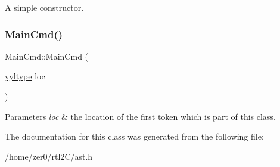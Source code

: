 A simple constructor. \mbox{\label{class_main_cmd_a36da38d394389df52d99475914d62171}} 
\subsubsection{\texorpdfstring{Main\+Cmd()}{MainCmd()}\hspace{0.1cm}{\footnotesize\ttfamily [2/2]}}
{\footnotesize\ttfamily Main\+Cmd\+::\+Main\+Cmd (\begin{DoxyParamCaption}\item[{\hyperlink{structyyltype}{yyltype}}]{loc }\end{DoxyParamCaption})\hspace{0.3cm}{\ttfamily [inline]}}


\begin{DoxyParams}{Parameters}
{\em loc} & the location of the first token which is part of this class. \\
\hline
\end{DoxyParams}


The documentation for this class was generated from the following file\+:\begin{DoxyCompactItemize}
\item 
/home/zer0/rtl2\+C/ast.\+h\end{DoxyCompactItemize}
